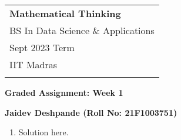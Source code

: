 \documentclass[a4paper,12pt]{article} %
\begin{document}
\thispagestyle{empty} %

\begin{tabular}{p{15.5cm}} %
{\large \bf Mathematical Thinking} \\
BS In Data Science \& Applications  \\ Sept 2023 Term  \\ IIT Madras\\
\hline %
\\
\end{tabular} %

\vspace*{0.3cm} %

\begin{center} %
	{\Large \bf Graded Assignment: Week 1} %
	\vspace{2mm}
	
	{\bf Jaidev Deshpande (Roll No: 21F1003751)} %
		
\end{center}  

\vspace{0.4cm}

\begin{enumerate}

\item Solution here.
\end{enumerate}
\end{document}
